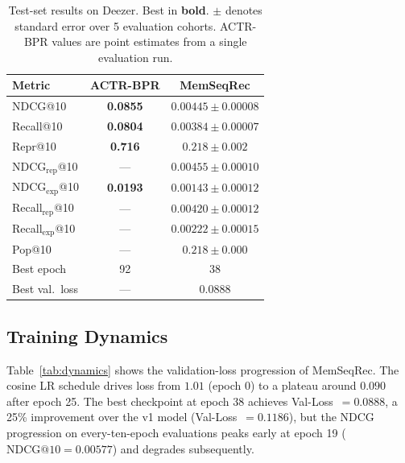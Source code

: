 \documentclass[conference]{IEEEtran}
\begin{document}
\begin{table}[h]
\centering
\caption{Test-set results on Deezer. Best in \textbf{bold}.
         $\pm$ denotes standard error over 5 evaluation cohorts.
         ACTR-BPR values are point estimates from a single
         evaluation run.}
\label{tab:main}
\setlength{\tabcolsep}{4pt}
\begin{tabular}{lcc}
\toprule
\textbf{Metric} & \textbf{ACTR-BPR} & \textbf{MemSeqRec} \\
\midrule
NDCG@10           & \textbf{0.0855} & $0.00445 \pm 0.00008$ \\
Recall@10         & \textbf{0.0804} & $0.00384 \pm 0.00007$ \\
Repr@10           & \textbf{0.716}  & $0.218 \pm 0.002$ \\
NDCG$_\text{rep}$@10 & ---          & $0.00455 \pm 0.00010$ \\
NDCG$_\text{exp}$@10 & \textbf{0.0193} & $0.00143 \pm 0.00012$ \\
Recall$_\text{rep}$@10 & ---        & $0.00420 \pm 0.00012$ \\
Recall$_\text{exp}$@10 & ---        & $0.00222 \pm 0.00015$ \\
Pop@10            & ---             & $0.218 \pm 0.000$ \\
\midrule
Best epoch        & 92              & 38 \\
Best val.\ loss   & ---             & 0.0888 \\
\bottomrule
\end{tabular}
\end{table}

\subsection{Training Dynamics}

Table~\ref{tab:dynamics} shows the validation-loss progression of
MemSeqRec.
The cosine LR schedule drives loss from $1.01$ (epoch 0) to a
plateau around $0.090$ after epoch 25.
The best checkpoint at epoch 38 achieves Val-Loss~$= 0.0888$,
a 25\% improvement over the v1 model (Val-Loss~$= 0.1186$), but
the NDCG progression on every-ten-epoch evaluations peaks early
at epoch 19 ($\text{NDCG@10} = 0.00577$) and degrades
subsequently.
\end{document}
